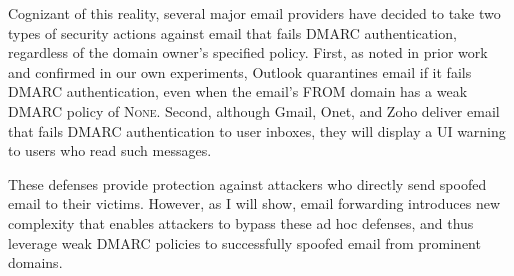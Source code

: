 %

Cognizant of this reality, several major email providers have decided to take two types of security actions against email that fails DMARC authentication, regardless of the domain owner's specified policy.
First, as noted in prior work~\cite{hu_end--end_nodate} and confirmed in our own experiments, Outlook quarantines email if it fails DMARC authentication, even when the email's \textsc{FROM} domain has a weak DMARC policy of \textsc{None}.
Second, although Gmail, Onet, and Zoho deliver email that fails DMARC authentication to user inboxes, they will display a UI warning to users who read such messages.

These defenses provide protection against attackers who directly send spoofed email to their victims.  However, as I will show,
email forwarding introduces new complexity that enables attackers to bypass these ad hoc defenses, and thus leverage weak DMARC policies to successfully spoofed email from prominent domains.

